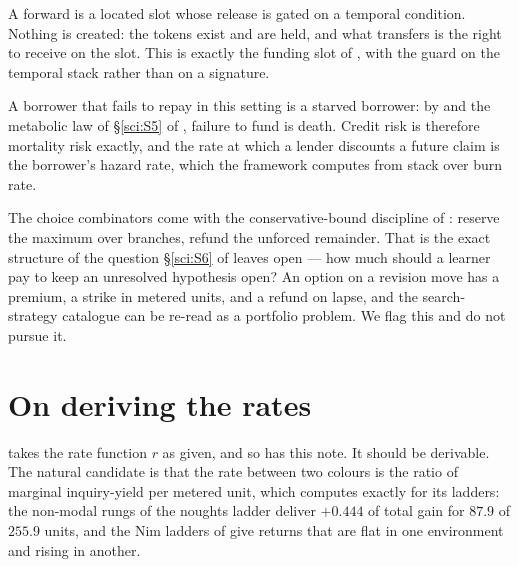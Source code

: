 \begin{proposition}\label{eng:credit-minting}
A forward is a located slot whose release is gated on a temporal
condition. Nothing is created: the tokens exist and are held, and what
transfers is the right to receive on the slot. This is exactly the funding
slot of \cite[\S3.2]{finrho}, with the guard on the temporal stack rather
than on a signature.
\end{proposition}

\begin{proposition}\label{eng:discount-rate-hazard-rate}
A borrower that fails to repay in this setting is a starved borrower: by
\cite[Def.~1]{MC} and the metabolic law of \S\ref{sci:S5} of \chSci, failure
to fund is death. Credit risk is therefore mortality risk exactly, and the
rate at which a lender discounts a future claim is the borrower's hazard
rate, which the framework computes from stack over burn rate.
\end{proposition}

\begin{remark}\label{eng:options-price-exploration-budget}
The choice combinators come with the conservative-bound discipline of
\cite[\S3.5]{finrho}: reserve the maximum over branches, refund the
unforced remainder. That is the exact structure of the question
\S\ref{sci:S6} of \chSci leaves open --- how much should a learner pay to keep
an unresolved hypothesis open? An option on a revision move has a premium,
a strike in metered units, and a refund on lapse, and the search-strategy
catalogue can be re-read as a portfolio problem. We flag this and do not
pursue it.
\end{remark}

\section{On deriving the rates}\label{eng:S12}
\label{eng:sec:rates}

\cite{vtok} takes the rate function $r$ as given, and so has this note. It
should be derivable. The natural candidate is that the rate between two
colours is the ratio of marginal inquiry-yield per metered unit, which
\chGame computes exactly for its ladders: the non-modal rungs of the
noughts ladder deliver $+0.444$ of total gain for $87.9$ of $255.9$ units,
and the Nim ladders of \chComp give returns that are flat in one
environment and rising in another.

